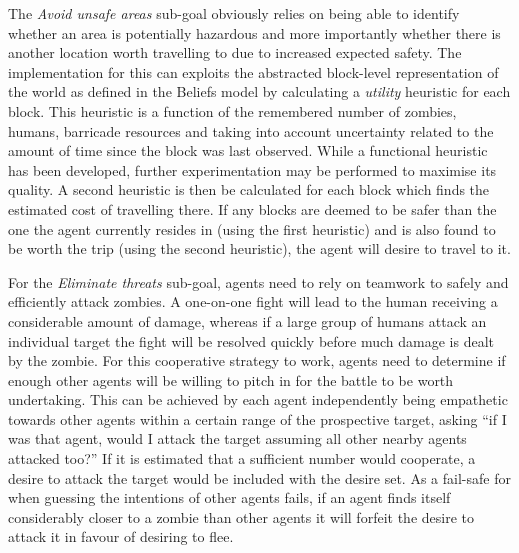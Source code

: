 \documentclass[a4paper,12pt]{article}
\begin{document}
The \emph{Avoid unsafe areas} sub-goal obviously relies on being able to identify whether an area is potentially hazardous and more importantly whether there is another location worth travelling to due to increased expected safety. The implementation for this can exploits the abstracted block-level representation of the world as defined in the Beliefs model by calculating a \emph{utility} heuristic for each block. This heuristic is a function of the remembered number of zombies, humans, barricade resources and taking into account uncertainty related to the amount of time since the block was last observed. While a functional heuristic has been developed, further experimentation may be performed to maximise its quality. A second heuristic is then be calculated for each block which finds the estimated cost of travelling there. If any blocks are deemed to be safer than the one the agent currently resides in (using the first heuristic) and is also found to be worth the trip (using the second heuristic), the agent will desire to travel to it.

For the \emph{Eliminate threats} sub-goal, agents need to rely on teamwork to safely and efficiently attack zombies. A one-on-one fight will lead to the human receiving a considerable amount of damage, whereas if a large group of humans attack an individual target the fight will be resolved quickly before much damage is dealt by the zombie. For this cooperative strategy to work, agents need to determine if enough other agents will be willing to pitch in for the battle to be worth undertaking. This can be achieved by each agent independently being empathetic towards other agents within a certain range of the prospective target, asking ``if I was that agent, would I attack the target assuming all other nearby agents attacked too?'' If it is estimated that a sufficient number would cooperate, a desire to attack the target would be included with the desire set. As a fail-safe for when guessing the intentions of other agents fails, if an agent finds itself considerably closer to a zombie than other agents it will forfeit the desire to attack it in favour of desiring to flee.
\end{document}
